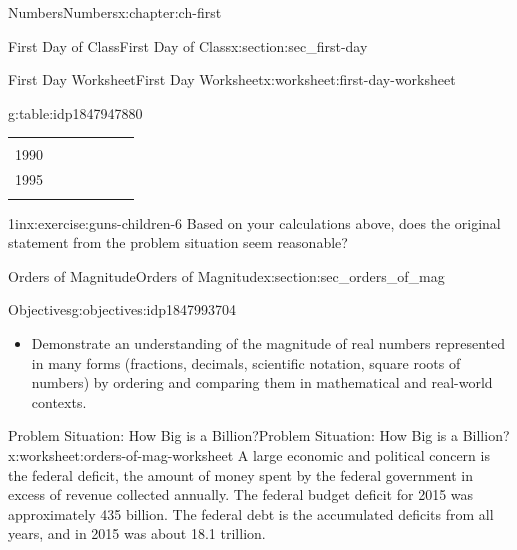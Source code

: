 \documentclass[twoside,10pt,]{book}
\makeatletter
\numberwithin{equation}{chapter}
\newcommand{\hrulethin}  {\noalign{\hrule height 0.04em}}
\newcommand{\tablecelllines}[3]%
{\begin{tabular}[#2]{@{}#1@{}}#3\end{tabular}}
\makeatother
\begin{document}
\begin{chapterptx}{Numbers}{}{Numbers}{}{}{x:chapter:ch-first}
\begin{sectionptx}{First Day of Class}{}{First Day of Class}{}{}{x:section:sec_first-day}
\begin{worksheet-subsection}{First Day Worksheet}{}{First Day Worksheet}{}{}{x:worksheet:first-day-worksheet}
\begin{tableptx}{\textbf{}}{g:table:idp1847947880}{}
{\begin{tabular}{AlAlAlA}
{}
\tabularnewline\hrulethin
1990&\tablecelllines{l}{m}
{\\
}
&\tablecelllines{l}{m}
{\\
}
\tabularnewline\hrulethin
1995&\tablecelllines{l}{m}
{\\
}
&\tablecelllines{l}{m}
{\\
}
\tabularnewline\hrulethin
\end{tabular}
}%
\end{tableptx}%
\begin{divisionexercise}{17}{}{1in}{x:exercise:guns-children-6}%
Based on your calculations above, does the original statement from the problem situation seem reasonable?%
\end{divisionexercise}%
\end{worksheet-subsection}
\restoregeometry
\end{sectionptx}
%
%
\typeout{************************************************}
\typeout{************************************************}
%
\begin{sectionptx}{Orders of Magnitude}{}{Orders of Magnitude}{}{}{x:section:sec_orders_of_mag}
\begin{objectives}{Objectives}{g:objectives:idp1847993704}
%
\begin{itemize}[label=\textbullet]
\item{}Demonstrate an understanding of the magnitude of real numbers represented in many forms (fractions, decimals, scientific notation, square roots of numbers) by ordering and comparing them in mathematical and real-world contexts.%
\end{itemize}
\end{objectives}
%
%
\typeout{************************************************}
\typeout{************************************************}
%
\begin{worksheet-subsection-numberless}{Problem Situation: How Big is a Billion?}{}{Problem Situation: How Big is a Billion?}{}{}{x:worksheet:orders-of-mag-worksheet}
A large economic and political concern is the federal deficit, the amount of money spent by the federal government in excess of revenue collected annually.  The federal budget deficit for 2015 was approximately \textdollar{}435 billion.  The federal debt is the accumulated deficits from all years, and in 2015 was about \textdollar{}18.1 trillion.%
\par

\end{worksheet-subsection-numberless}
\end{sectionptx}
\end{chapterptx}
\end{document}
